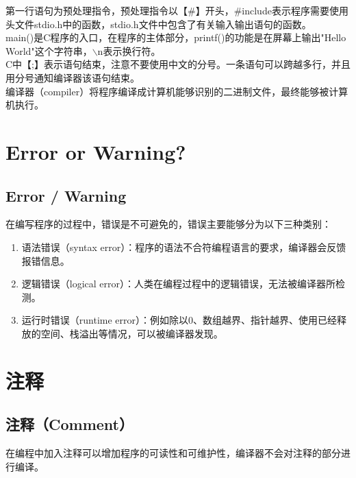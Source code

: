第一行语句为预处理指令，预处理指令以【\#】开头，\#include表示程序需要使用头文件stdio.h中的函数，stdio.h文件中包含了有关输入输出语句的函数。\\

main()是C程序的入口，在程序的主体部分，printf()的功能是在屏幕上输出"Hello World"这个字符串，$ \backslash $n表示换行符。\\

C中【;】表示语句结束，注意不要使用中文的分号。一条语句可以跨越多行，并且用分号通知编译器该语句结束。\\

编译器（compiler）将程序编译成计算机能够识别的二进制文件，最终能够被计算机执行。

\newpage

\section{Error or Warning?}

\subsection{Error / Warning}

在编写程序的过程中，错误是不可避免的，错误主要能够分为以下三种类别：

\begin{enumerate}
	\item 语法错误（syntax error）：程序的语法不合符编程语言的要求，编译器会反馈报错信息。

	\item 逻辑错误（logical error）：人类在编程过程中的逻辑错误，无法被编译器所检测。

	\item 运行时错误（runtime error）：例如除以0、数组越界、指针越界、使用已经释放的空间、栈溢出等情况，可以被编译器发现。
\end{enumerate}

\newpage

\section{注释}

\subsection{注释（Comment）}

在编程中加入注释可以增加程序的可读性和可维护性，编译器不会对注释的部分进行编译。\\

